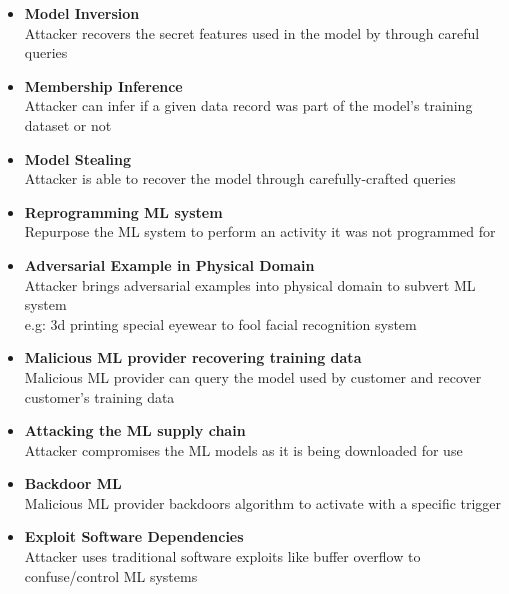 {\begin{itemize}
\begin{itemize}
{            In the Tay chatbot, future conversations were tainted because a fraction of the past conversations were used to
            train the system via feedback.
            }
      \end{itemize}
      \item \textbf{Model Inversion}\\
      Attacker recovers the secret features used in the model by through careful queries
      \item \textbf{Membership Inference}\\
      Attacker can infer if a given data record was part of the model’s training dataset or not
      \item \textbf{Model Stealing}\\
      Attacker is able to recover the model through carefully-crafted queries
      \item \textbf{Reprogramming ML system}\\
      Repurpose the ML system to perform an activity it was not programmed for
      \item \textbf{Adversarial Example in Physical Domain}\\
      Attacker brings adversarial examples into
      physical domain to subvert ML system\\
      e.g: 3d printing special eyewear to fool facial recognition system
      \item \textbf{Malicious ML provider recovering training data}\\
      Malicious ML provider can query the model used by
      customer and recover customer’s training data
      \item \textbf{Attacking the ML supply chain}\\
      Attacker compromises the ML models as it is being downloaded for use
      \item \textbf{Backdoor ML}\\
      Malicious ML provider backdoors algorithm to activate with a specific trigger
      \item \textbf{Exploit Software Dependencies}\\
      Attacker uses traditional software exploits like buffer overflow to confuse/control ML systems
   \end{itemize}
}
